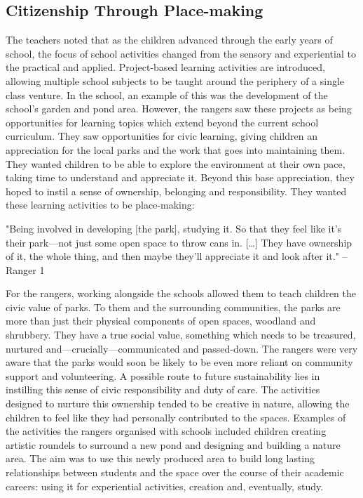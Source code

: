 \subsection{Citizenship Through Place-making}

The teachers noted that as the children advanced through the early years of school, the focus of school activities changed from the sensory and experiential to the practical and applied. Project-based learning activities are introduced, allowing multiple school subjects to be taught around the periphery of a single class venture. In the school, an example of this was the development of the school’s garden and pond area. However, the rangers saw these projects as being opportunities for learning topics which extend beyond the current school curriculum.  They saw opportunities for civic learning, giving children an appreciation for the local parks and the work that goes into maintaining them. They wanted children to be able to explore the environment at their own pace, taking time to understand and appreciate it. Beyond this base appreciation, they hoped to instil a sense of ownership, belonging and responsibility. They wanted these learning activities to be place-making:

\begin{displayquote}
"Being involved in developing [the park], studying it. So that they feel like it's their park---not just some open space to throw cans in. […] They have ownership of it, the whole thing, and then maybe they’ll appreciate it and look after it." – Ranger 1
\end{displayquote}

For the rangers, working alongside the schools allowed them to teach children the civic value of parks. To them and the surrounding communities, the parks are more than just their physical components of open spaces, woodland and shrubbery. They have a true social value, something which needs to be treasured, nurtured and---crucially---communicated and passed-down. The rangers were very aware that the parks would soon be likely to be even more reliant on community support and volunteering. A possible route to future sustainability lies in instilling this sense of civic responsibility and duty of care. The activities designed to nurture this ownership tended to be creative in nature, allowing the children to feel like they had personally contributed to the spaces. Examples of the activities the rangers organised with schools included children creating artistic roundels to surround a new pond and designing and building a nature area. The aim was to use this newly produced area to build long lasting relationships between students and the space over the course of their academic careers: using it for experiential activities, creation and, eventually, study. 

